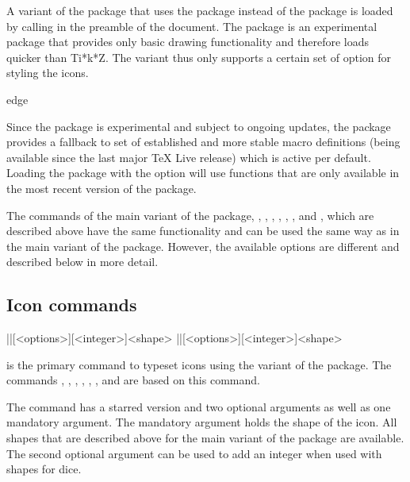 \documentclass[a4paper]{article}
\begin{document}
A variant of the package that uses the  package instead of the  package is loaded by calling \macro{\usepackage{dndicons-l3draw}} in the preamble of the document. The  package is an experimental package that provides only basic drawing functionality and therefore loads quicker than Ti*k*Z. The  variant thus only supports a certain set of option for styling the icons. 

\begin{macrodef}edge\end{macrodef}
Since the  package is experimental and subject to ongoing updates, the  package provides a fallback to set of established and more stable macro definitions (being available since the last major TeX Live release) which is active per default. Loading the  package with the option  will use functions that are only available in the most recent version of the  package.

The commands of the main variant of the package, \macro{\die}, \macro{\ability}, \macro{\saving}, \macro{\spell}, \macro{\spellschool}, \macro{\damage}, \macro{\attack} and \macro{\condition}, which are described above have the same functionality and can be used the same way as in the main variant of the package. However, the available options are different and described below in more detail.

\subsection{Icon commands}

\begin{macrodef}
|\DndIconsUseIcon|[<options>][<integer>]{<shape>}
|\DndIconsUseIcon*|[<options>][<integer>]{<shape>}
\end{macrodef}
\macro{\DndIconsUseIcon} is the primary command to typeset icons using the  variant of the package. The commands \macro{\die}, \macro{\ability}, \macro{\saving}, \macro{\spell}, \macro{\spellschool}, \macro{\damage}, \macro{\attack} and \macro{\condition} are based on this command. 

The \macro{\DndIconsUseIcon} command has a starred version and two optional arguments as well as one mandatory argument. The mandatory argument holds the shape of the icon. All shapes that are described above for the main variant of the package are available. The second optional argument can be used to add an integer when used with shapes for dice.
\end{document}

